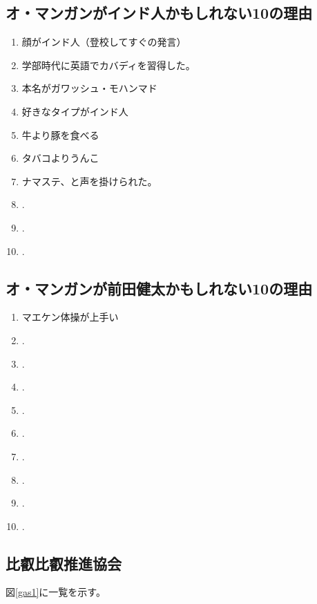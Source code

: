 \newpage
\subsection{オ・マンガンがインド人かもしれない10の理由}
\begin{enumerate}
\item 顔がインド人（登校してすぐの発言）
\item 学部時代に英語でカバディを習得した。
\item 本名がガワッシュ・モハンマド
\item 好きなタイプがインド人
\item 牛より豚を食べる
\item タバコよりうんこ
\item ナマステ、と声を掛けられた。
\item .
\item .
\item .
\end{enumerate}

\subsection{オ・マンガンが前田健太かもしれない10の理由}
\begin{enumerate}
\item マエケン体操が上手い
\item .
\item .
\item .
\item .
\item .
\item .
\item .
\item .
\item .
\end{enumerate}

\newpage
\subsection{比叡比叡推進協会}
図\ref{gas1}に一覧を示す。

